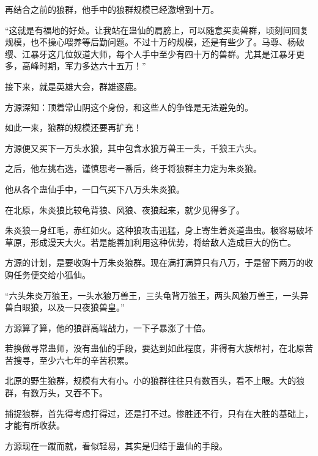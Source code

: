 \begin{this_body}
再结合之前的狼群，他手中的狼群规模已经激增到十万。

“这就是有福地的好处。让我站在蛊仙的肩膀上，可以随意买卖兽群，顷刻间回复规模，也不操心喂养等后勤问题。不过十万的规模，还是有些少了。马尊、杨破缨、江暴牙这几位奴道大师，每个人手中至少有四十万的兽群。尤其是江暴牙更多，高峰时期，军力多达六十五万！”

接下来，就是英雄大会，群雄逐鹿。

方源深知：顶着常山阴这个身份，和这些人的争锋是无法避免的。

如此一来，狼群的规模还要再扩充！

方源便又买下一万头水狼，其中包含水狼万兽王一头，千狼王六头。

之后，他左挑右选，谨慎思考一番后，终于将狼群主力定为朱炎狼。

他从各个蛊仙手中，一口气买下八万头朱炎狼。

在北原，朱炎狼比较龟背狼、风狼、夜狼起来，就少见得多了。

朱炎狼一身红毛，赤红如火。这种狼攻击迅猛，身上寄生着炎道蛊虫。极容易破坏草原，形成漫天大火。若是能善加利用这种优势，将给敌人造成巨大的伤亡。

方源的计划，是要收购十万朱炎狼群。现在满打满算只有八万，于是留下两万的收购任务便交给小狐仙。

“六头朱炎万狼王，一头水狼万兽王，三头龟背万狼王，两头风狼万兽王，一头异兽白眼狼，以及一只夜狼兽皇。”

方源算了算，他的狼群高端战力，一下子暴涨了十倍。

若换做寻常蛊师，没有蛊仙的手段，要达到如此程度，非得有大族帮衬，在北原苦苦搜寻，至少六七年的辛苦积累。

北原的野生狼群，规模有大有小。小的狼群往往只有数百头，看不上眼。大的狼群，有数万头，又吞不下。

捕捉狼群，首先得考虑打得过，还是打不过。惨胜还不行，只有在大胜的基础上，才能有所收获。

方源现在一蹴而就，看似轻易，其实是归结于蛊仙的手段。

\end{this_body}

